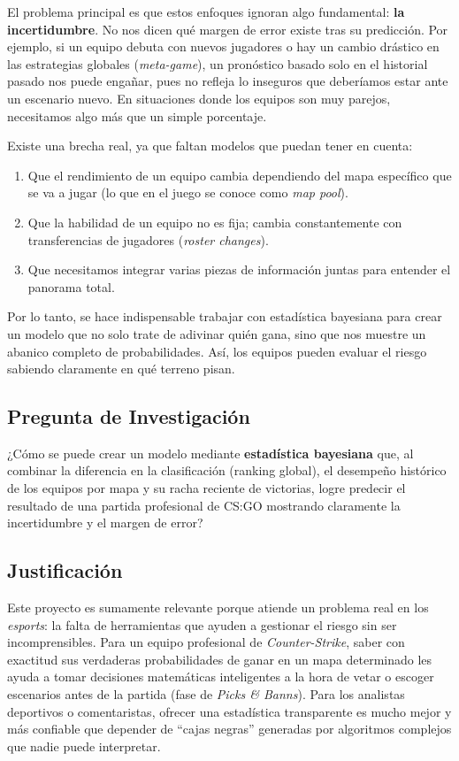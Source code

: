 \documentclass[twocolumn,10pt]{article}
\begin{document}
El problema principal es que estos enfoques ignoran algo fundamental: \textbf{la incertidumbre}. No nos dicen qué margen de error existe tras su predicción. Por ejemplo, si un equipo debuta con nuevos jugadores o hay un cambio drástico en las estrategias globales (\textit{meta-game}), un pronóstico basado solo en el historial pasado nos puede engañar, pues no refleja lo inseguros que deberíamos estar ante un escenario nuevo. En situaciones donde los equipos son muy parejos, necesitamos algo más que un simple porcentaje.

Existe una brecha real, ya que faltan modelos que puedan tener en cuenta:
\begin{enumerate}[noitemsep]
    \item Que el rendimiento de un equipo cambia dependiendo del mapa específico que se va a jugar (lo que en el juego se conoce como \textit{map pool}).
    \item Que la habilidad de un equipo no es fija; cambia constantemente con transferencias de jugadores (\textit{roster changes}).
    \item Que necesitamos integrar varias piezas de información juntas para entender el panorama total.
\end{enumerate}

Por lo tanto, se hace indispensable trabajar con estadística bayesiana para crear un modelo que no solo trate de adivinar quién gana, sino que nos muestre un abanico completo de probabilidades. Así, los equipos pueden evaluar el riesgo sabiendo claramente en qué terreno pisan.

\subsection{Pregunta de Investigación}

¿Cómo se puede crear un modelo mediante \textbf{estadística bayesiana} que, al combinar la diferencia en la clasificación (ranking global), el desempeño histórico de los equipos por mapa y su racha reciente de victorias, logre predecir el resultado de una partida profesional de CS:GO mostrando claramente la incertidumbre y el margen de error?

\subsection{Justificación}

Este proyecto es sumamente relevante porque atiende un problema real en los \textit{esports}: la falta de herramientas que ayuden a gestionar el riesgo sin ser incomprensibles. Para un equipo profesional de \textit{Counter-Strike}, saber con exactitud sus verdaderas probabilidades de ganar en un mapa determinado les ayuda a tomar decisiones matemáticas inteligentes a la hora de vetar o escoger escenarios antes de la partida (fase de \textit{Picks \& Banns}). Para los analistas deportivos o comentaristas, ofrecer una estadística transparente es mucho mejor y más confiable que depender de ``cajas negras'' generadas por algoritmos complejos que nadie puede interpretar.
\end{document}
